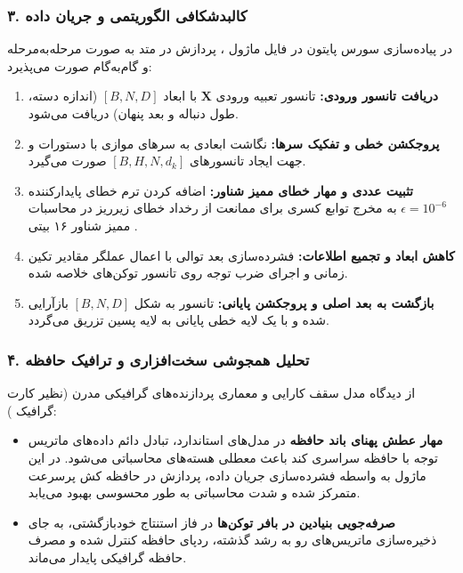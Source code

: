 \subsubsection*{۳. کالبدشکافی الگوریتمی و جریان داده }
در پیاده‌سازی سورس پایتون در فایل ماژول ، پردازش در متد  به صورت مرحله‌به‌مرحله و گام‌به‌گام صورت می‌پذیرد:
\begin{enumerate}
\item \textbf{دریافت تانسور ورودی:} تانسور تعبیه ورودی $\mathbf{X}$ با ابعاد $[B, N, D]$ (اندازه دسته، طول دنباله و بعد پنهان) دریافت می‌شود.
\item \textbf{پروجکشن خطی و تفکیک سرها:} نگاشت ابعادی به سرهای موازی با دستورات  و  جهت ایجاد تانسورهای $[B, H, N, d_k]$ صورت می‌گیرد.
\item \textbf{تثبیت عددی و مهار خطای ممیز شناور:} اضافه کردن ترم خطای پایدارکننده $\epsilon = 10^{-6}$ به مخرج توابع کسری برای ممانعت از رخداد خطای زیرریز  در محاسبات ممیز شناور ۱۶ بیتی .
\item \textbf{کاهش ابعاد و تجمیع اطلاعات:} فشرده‌سازی بعد توالی با اعمال عملگر مقادیر تکین زمانی و اجرای ضرب توجه روی تانسور توکن‌های خلاصه شده.
\item \textbf{بازگشت به بعد اصلی و پروجکشن پایانی:} تانسور به شکل $[B, N, D]$ بازآرایی شده و با یک لایه خطی پایانی به لایه پسین تزریق می‌گردد.
\end{enumerate}

\subsubsection*{۴. تحلیل همجوشی سخت‌افزاری و ترافیک حافظه }
از دیدگاه مدل سقف کارایی  و معماری پردازنده‌های گرافیکی مدرن (نظیر کارت گرافیک ):
\begin{itemize}
\item \textbf{مهار عطش پهنای باند حافظه } \rl{:}  در مدل‌های استاندارد، تبادل دائم داده‌های ماتریس توجه با حافظه سراسری کند  باعث معطلی هسته‌های محاسباتی می‌شود. در این ماژول به واسطه فشرده‌سازی جریان داده، پردازش در حافظه کش پرسرعت  متمرکز شده و شدت محاسباتی  به طور محسوسی بهبود می‌یابد.
\item \textbf{صرفه‌جویی بنیادین در بافر توکن‌ها } \rl{:}  در فاز استنتاج خودبازگشتی، به جای ذخیره‌سازی ماتریس‌های رو به رشد گذشته، ردپای حافظه کنترل شده و مصرف حافظه گرافیکی پایدار می‌ماند.
\end{itemize}

